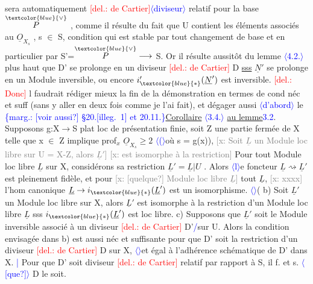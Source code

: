 \documentclass[11pt]{article}
\newcommand{\scanpage}[1]{\par\bigskip\noindent{\small\sffamily[scan #1]}\par}
\newcommand{\mspage}[1]{{\small\sffamily[p.\,#1]}}
\newcommand{\hand}[1]{\textcolor{blue}{#1}}
\let\over\relax
\newcommand{\over}[2]{\textcolor{gray}{#1}\textcolor{blue}{\ensuremath{^{\!\nearrow}}#2}}
\newcommand{\inserted}[2][]{\textcolor{blue}{$\langle$#2$\rangle$}}
\newcommand{\margin}[1]{\textcolor{blue}{\{\textsf{marg.:} #1\}}}
\newcommand{\deleted}[1]{\textcolor{red}{[\textsf{del.:} #1]}}
\newcommand{\xout}[1]{\textcolor{gray}{[\textsf{x:} #1]}}
\newcommand{\uline}[1]{\underline{#1}}
\newcommand{\unsure}[1]{[#1?]}
\newcommand{\illegible}[1]{[\textsf{illeg.\ #1}]}
\begin{document}
\mspage{120}

\clearpage
\scanpage{25/121}
\mspage{24}

sera automatiquement \deleted{de Cartier}\inserted{diviseur} relatif pour la base $\overset{\hand{\vee}}{P}$ , comme il
résulte du fait que U contient les éléments associés au $\underline{O}_{X_s}$ , s $\in$ S,
condition qui est stable par tout changement de base et en particulier
par S'=$\overset{\hand{\vee}}{P} \longrightarrow$ S. Or il résulte aussitôt du lemme \inserted{4.2.} plus haut que D' se
prolonge en un diviseur \deleted{de Cartier} D \uline{sss} $\underline{N}'$ se prolonge en un Module
inversible, ou encore $i'_{\hand{*}}(\underline{N}')$ est inversible. \deleted{Donc} \over{i}{I}l faudrait rédiger
mieux la fin de la démonstration en termes de cond néc et suff (sans y
aller en deux fois comme je l'ai fait), et dégager aussi \inserted{d'abord} le
\margin{\unsure{voir aussi} \S 20.\illegible{1} et 20.11.}\uline{Corollaire} \inserted{3.4.} \uline{au lemme}\hand{3.2}. Supposons g:X$\to$S plat loc de présentation finie,
soit Z une partie fermée de X telle que x $\in$ Z implique prof$_x$ $\underline{O}_{X_s} \geq 2$
\inserted[soit U=X-Z et i:U$\to$X l'immersion c an.]
(où s = g(x)), \xout{Soit $\underline{L}$ un Module loc libre sur U = X-Z, alors $\underline{L}'$}
\xout{est isomorphe à la restriction} Pour tout Module loc libre \inserted[de t.f] $\underline{L}$ sur X,
considérons sa restriction $\underline{L}' = \underline{L}|U$ . Alors \inserted[a)] le foncteur $\underline{L} \rightsquigarrow \underline{L}'$ est
pleinement fidèle, et pour \xout{\unsure{quelque} Module loc libre $\underline{L}$} tout $\underline{L}$, \xout{xxxx}
l'hom canonique $\underline{L} \to i_{\hand{*}}(\underline{L}')$ est un isomorphisme. \inserted[Pour que $\underline{L}$ soit de rang n, il f et s que $\underline{L}'$ le soit.] \hand{(} b) Soit $\underline{L}'$ un
Module loc libre sur X, alors $\underline{L}'$ est isomorphe à la restriction d'un
Module loc libre $\underline{L}$ sss $i_{\hand{*}}(\underline{L}')$ est loc libre. c) Supposons que $\underline{L}'$ soit
le Module inversible associé à un diviseur \deleted{de Cartier} D'\hand{/}sur U. Alors
la condition envisagée dans b) est aussi néc et suffisante pour que D'
soit la restriction d'un diviseur \deleted{de Cartier} D sur X, \inserted[lequel sera alors unique,]\inserted{et égal à l'adhérence schématique de D' dans X.} \hand{|} Pour que D' soit
diviseur \deleted{de Cartier} relatif par rapport à S, il f. et s. \inserted{\unsure{que}} D le soit.
\end{document}
